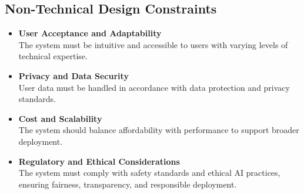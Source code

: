 \subsection{Non-Technical Design Constraints}

\begin{itemize}
\item \textbf{User Acceptance and Adaptability} \\
The system must be intuitive and accessible to users with varying levels of technical expertise.

\item \textbf{Privacy and Data Security} \\
User data must be handled in accordance with data protection and privacy standards.

\item \textbf{Cost and Scalability} \\
The system should balance affordability with performance to support broader deployment.

\item \textbf{Regulatory and Ethical Considerations} \\
The system must comply with safety standards and ethical AI practices, ensuring fairness, transparency, and responsible deployment.
\end{itemize}
\newpage
